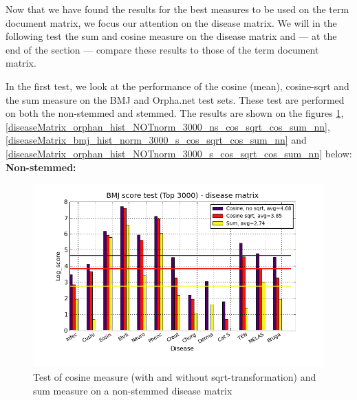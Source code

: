 Now that we have found the results for the best measures to be used on
the term document matrix, we focus our attention on the disease
matrix. We will in the following test the sum and cosine measure
on the disease matrix and --- at the end of the section --- compare these
results to those of the term document matrix.

In the first test, we look at the performance of the cosine (mean),
cosine-sqrt and the sum measure on the BMJ and Orpha.net test
sets. These test are performed on both the non-stemmed and
stemmed. The results are shown on the figures
\ref{diseaseMatrix_bmj_hist_norm_3000_ns_cos_sqrt_cos_sum_nn},
\ref{diseaseMatrix_orphan_hist_NOTnorm_3000_ns_cos_sqrt_cos_sum_nn},
\ref{diseaseMatrix_bmj_hist_norm_3000_s_cos_sqrt_cos_sum_nn} and
\ref{diseaseMatrix_orphan_hist_NOTnorm_3000_s_cos_sqrt_cos_sum_nn}
below:\\

\noindent \textbf{Non-stemmed:}

\begin{figure}[H]
  \caption{Test of cosine measure (with and without sqrt-transformation) and sum measure on a non-stemmed disease matrix}
  \begin{center}
    \includegraphics[width=1.2\textwidth]{barcharts/diseaseMatrix_bmj_hist_norm_3000_ns_cos_sqrt_cos_sum_nn.png}
  \end{center}
  \label{diseaseMatrix_bmj_hist_norm_3000_ns_cos_sqrt_cos_sum_nn}
\end{figure}

